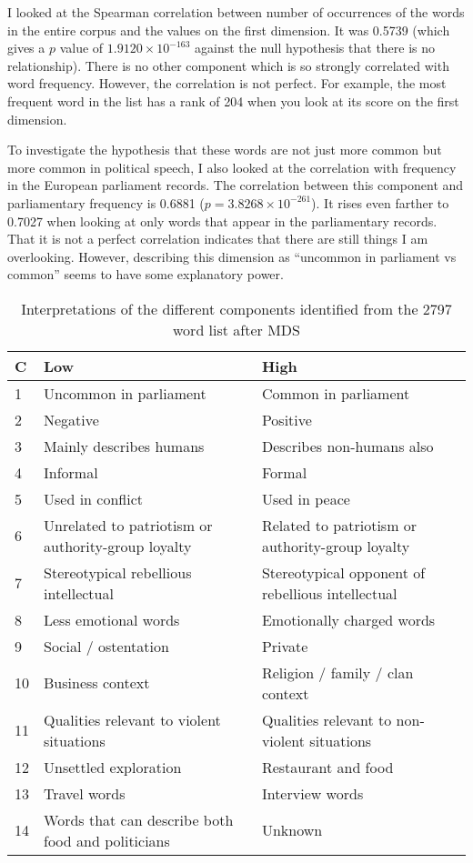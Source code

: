 I looked at the Spearman correlation between number of occurrences of the words 
in the entire corpus and the values on the first dimension. It was 0.5739 
(which gives a $p$ value of $1.9120 \times 10^{-163}$ against the null hypothesis 
that there is no relationship). There is no other component which is so 
strongly correlated with word frequency. However, the correlation is not 
perfect. For example, the most frequent word in the list has a rank of 204 when 
you look at its score on the first dimension.

To investigate the hypothesis that these words are not just more common but 
more common in political speech, I also looked at the correlation with 
frequency in the European parliament records. The correlation between this 
component and parliamentary frequency is 0.6881 
($p=3.8268 \times 10^{-261}$).  It rises even farther to 0.7027 when looking 
at only words that appear in the 
parliamentary records. That it is not a perfect correlation indicates that 
there are still things I am overlooking. However, describing this dimension as 
``uncommon in parliament vs common'' seems to have some explanatory power.

\begin{table}[tbp]
\begin{tabular}{ | l |p{2in}|p{2in}|}
 \hline
 C & Low & High \\
 \hline
 1 & Uncommon in parliament & Common in parliament\\
 2 & Negative & Positive\\
 3 & Mainly describes humans & Describes non-humans also \\
 4 & Informal & Formal \\
 5 & Used in conflict & Used in peace \\
 6 & Unrelated to patriotism or authority-group loyalty & Related to 
     patriotism or authority-group loyalty \\
 7 & Stereotypical rebellious intellectual & Stereotypical opponent of 
     rebellious intellectual \\
 8 & Less emotional words & Emotionally charged words \\
 9 & Social / ostentation & Private  \\
 10 & Business context & Religion / family / clan context \\
 11 & Qualities relevant to violent situations & Qualities relevant to 
       non-violent situations \\
 12 & Unsettled exploration & Restaurant and food \\
 13 & Travel words & Interview words \\
 14 & Words that can describe both food and politicians &  Unknown \\
 \hline
\end{tabular}
 \caption{Interpretations of the different components identified from the 2797
 word list after MDS}
 \label{tab:2797mdsinterp}
\end{table}

